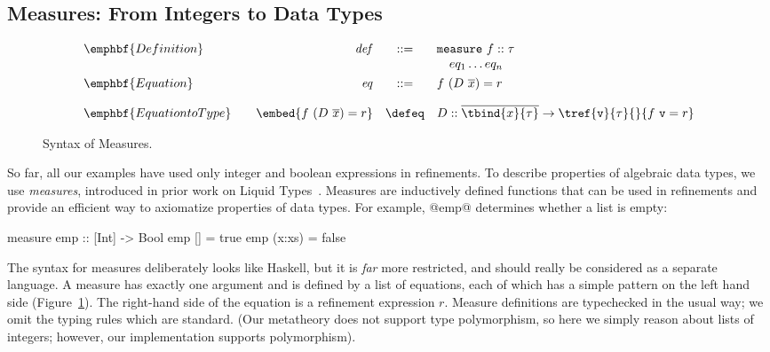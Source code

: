 \newcommand\hnull{\ensuremath{\text{[]}}\xspace}

\subsection{Measures: From Integers to Data Types}\label{sec:measures}

\begin{figure}
\centering
\captionsetup{justification=centering}
$$
\begin{array}{lrcl}
{\emphbf{Definition}} &
  \mathit{def} & ::=  &  \mathtt{measure} \ f :: \tau \\
              & &      &  \quad eq_1 \ldots eq_n       \\[0.05in]

{\emphbf{Equation}}   & 
  \mathit{eq}  & ::=  &   f\ (D\ \overline{x}) = r    \\[0.15in] 

{\emphbf{Equation to Type}} &
\quad \embed{f\ (D\ \overline{x}) = r} & \defeq & D :: \overline{\tbind{x}{\tau}} \rightarrow \tref{\mathtt{v}}{\tau}{}{f\ \mathtt{v} = r}
\end{array}
$$
\caption{Syntax of Measures.}
\label{fig:measures}
\end{figure}



So far, all our examples have used only integer and boolean expressions in refinements.
To describe properties of algebraic data types, we use \emph{measures},
introduced in prior work on Liquid Types~\cite{LiquidPLDI09}.
%
Measures are inductively defined functions that can be used in refinements and
provide an efficient way to axiomatize properties of data types.
%
For example, @emp@ determines whether a list is empty:
%
\begin{code}
  measure emp  :: [Int] -> Bool
    emp []     = true
    emp (x:xs) = false
\end{code}
The syntax for measures deliberately looks like Haskell, but it is \emph{far} more
restricted, and should really be considered as a separate language.
A measure has exactly one argument and is defined by a list of equations,
each of which has a simple pattern on the left hand side (Figure~\ref{fig:measures}).
The right-hand side of the equation is a refinement expression $r$.
Measure definitions are typechecked in the usual way; we omit the typing rules which are standard.
(Our metatheory does not support type polymorphism,
so here we simply reason about lists of integers;
however, our implementation supports polymorphism).

